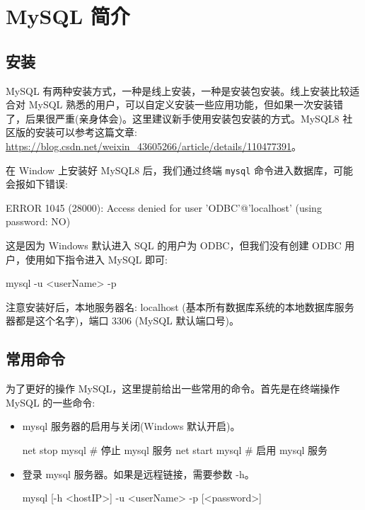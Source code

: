 \section{MySQL 简介}

\subsection{安装}

MySQL 有两种安装方式，一种是线上安装，一种是安装包安装。线上安装比较适合对 MySQL 熟悉的用户，可以自定义安装一些应用功能，但如果一次安装错了，后果很严重(亲身体会)。这里建议新手使用安装包安装的方式。MySQL8 社区版的安装可以参考这篇文章: \url{https://blog.csdn.net/weixin_43605266/article/details/110477391}。

在 Window 上安装好 MySQL8 后，我们通过终端 \texttt{mysql} 命令进入数据库，可能会报如下错误:
\begin{bash}
ERROR 1045 (28000): Access denied for user 'ODBC'@'localhost' (using password: NO)
\end{bash}

这是因为 Windows 默认进入 SQL 的用户为 ODBC，但我们没有创建 ODBC 用户，使用如下指令进入 MySQL 即可:

\begin{bash}
mysql -u <userName> -p
\end{bash}

注意安装好后，本地服务器名: localhost (基本所有数据库系统的本地数据库服务器都是这个名字)，端口 3306 (MySQL 默认端口号)。

\subsection{常用命令}

为了更好的操作 MySQL，这里提前给出一些常用的命令。首先是在终端操作 MySQL 的一些命令:

\begin{itemize}
    \item mysql 服务器的启用与关闭(Windows 默认开启)。
\begin{bash}
net stop mysql  # 停止 mysql 服务
net start mysql  # 启用 mysql 服务
\end{bash}
    \item 登录 mysql 服务器。如果是远程链接，需要参数 -h。
\begin{bash}
mysql [-h <hostIP>] -u <userName> -p [<password>]
\end{bash}
\end{itemize}

